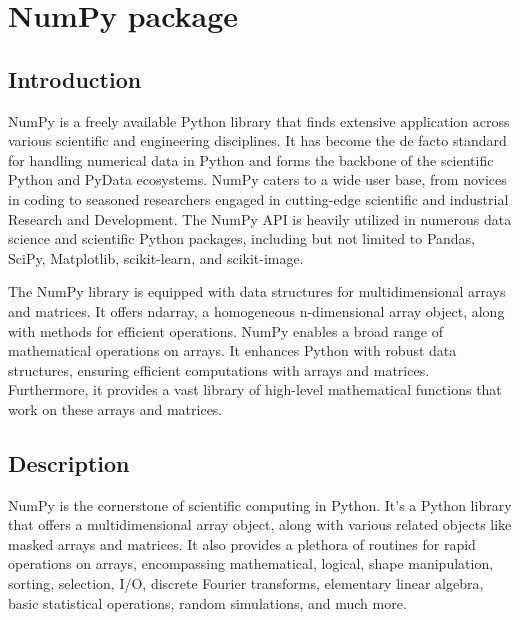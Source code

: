 %
%

\chapter{NumPy package}

\section{Introduction}

NumPy is a freely available Python library that finds extensive application across various scientific and engineering disciplines. It has become the de facto standard for handling numerical data in Python and forms the backbone of the scientific Python and PyData ecosystems. NumPy caters to a wide user base, from novices in coding to seasoned researchers engaged in cutting-edge scientific and industrial Research and Development. The NumPy API is heavily utilized in numerous data science and scientific Python packages, including but not limited to Pandas, SciPy, Matplotlib, scikit-learn, and scikit-image.\cite{Idris:2015}

\bigskip

The NumPy library is equipped with data structures for multidimensional arrays and matrices. It offers ndarray, a homogeneous n-dimensional array object, along with methods for efficient operations. NumPy enables a broad range of mathematical operations on arrays. It enhances Python with robust data structures, ensuring efficient computations with arrays and matrices. Furthermore, it provides a vast library of high-level mathematical functions that work on these arrays and matrices.

\section{Description}

NumPy is the cornerstone of scientific computing in Python. It's a Python library that offers a multidimensional array object, along with various related objects like masked arrays and matrices. It also provides a plethora of routines for rapid operations on arrays, encompassing mathematical, logical, shape manipulation, sorting, selection, I/O, discrete Fourier transforms, elementary linear algebra, basic statistical operations, random simulations, and much more.\cite{Idris:2015}

